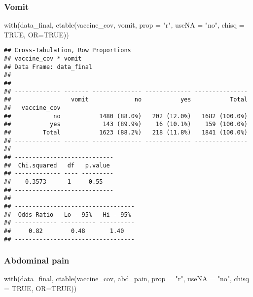 \documentclass[
]{article}
\newenvironment{Shaded}{\begin{snugshade}}{\end{snugshade}}
\newcommand{\AttributeTok}[1]{\textcolor[rgb]{0.77,0.63,0.00}{#1}}
\newcommand{\ConstantTok}[1]{\textcolor[rgb]{0.00,0.00,0.00}{#1}}
\newcommand{\FunctionTok}[1]{\textcolor[rgb]{0.00,0.00,0.00}{#1}}
\newcommand{\NormalTok}[1]{#1}
\newcommand{\StringTok}[1]{\textcolor[rgb]{0.31,0.60,0.02}{#1}}
\begin{document}
\hypertarget{vomit}{%
\subsubsection{Vomit}\label{vomit}}

\begin{Shaded}
\begin{Highlighting}[]
\FunctionTok{with}\NormalTok{(data\_final, }\FunctionTok{ctable}\NormalTok{(vaccine\_cov, vomit, }\AttributeTok{prop =} \StringTok{"r"}\NormalTok{, }\AttributeTok{useNA =} \StringTok{"no"}\NormalTok{, }\AttributeTok{chisq =} \ConstantTok{TRUE}\NormalTok{, }\AttributeTok{OR=}\ConstantTok{TRUE}\NormalTok{))}
\end{Highlighting}
\end{Shaded}

\begin{verbatim}
## Cross-Tabulation, Row Proportions  
## vaccine_cov * vomit  
## Data Frame: data_final  
## 
## 
## ------------- ------- -------------- ------------- ---------------
##                 vomit             no           yes           Total
##   vaccine_cov                                                     
##            no           1480 (88.0%)   202 (12.0%)   1682 (100.0%)
##           yes            143 (89.9%)    16 (10.1%)    159 (100.0%)
##         Total           1623 (88.2%)   218 (11.8%)   1841 (100.0%)
## ------------- ------- -------------- ------------- ---------------
## 
## ----------------------------
##  Chi.squared   df   p.value 
## ------------- ---- ---------
##    0.3573      1     0.55   
## ----------------------------
## 
## ----------------------------------
##  Odds Ratio   Lo - 95%   Hi - 95% 
## ------------ ---------- ----------
##     0.82        0.48       1.40   
## ----------------------------------
\end{verbatim}

\hypertarget{abdominal-pain}{%
\subsubsection{Abdominal pain}\label{abdominal-pain}}

\begin{Shaded}
\begin{Highlighting}[]
\FunctionTok{with}\NormalTok{(data\_final, }\FunctionTok{ctable}\NormalTok{(vaccine\_cov, abd\_pain, }\AttributeTok{prop =} \StringTok{"r"}\NormalTok{, }\AttributeTok{useNA =} \StringTok{"no"}\NormalTok{, }\AttributeTok{chisq =} \ConstantTok{TRUE}\NormalTok{, }\AttributeTok{OR=}\ConstantTok{TRUE}\NormalTok{))}
\end{Highlighting}
\end{Shaded}
\end{document}
